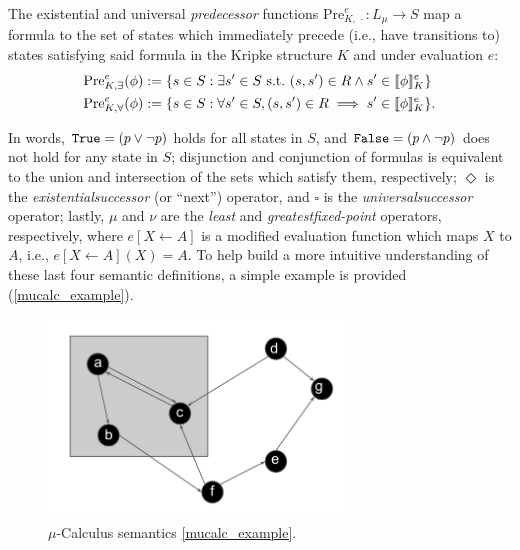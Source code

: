 \vspace*{2.2mm}
\noindent
The existential and universal {\em predecessor\/} functions $\text{Pre}_{K,\ \cdot}^e:L_\mu \to S$ map a \mucalc{} formula to the set of states which immediately precede (i.e., have transitions to) states satisfying said formula in the Kripke structure $K$ and under evaluation $e$:
\begin{align*}
    \Pree{\phi} &:= \{ s \in S : \exists s' \in S \ \text{s.t.} \ (s,s') \in R \land s' \in \brackets{\phi}_K^e\} \\
    \Prea{\phi} &:= \{ s \in S : \forall s' \in S, (s,s') \in R \implies s' \in \brackets{\phi}_K^e\}.
\end{align*}

In words, ${\texttt{True}}{} = (p \lor \lnot p)$ holds for all states in $S$, and ${\texttt{False}}{} = (p \land \lnot p)$ does not hold for any state in $S$; disjunction and conjunction of formulas is equivalent to the union and intersection of the sets which satisfy them, respectively; $\Diamond$ is the {\em existential\/successor} (or ``next'') operator, and $\square$ is the {\em universal\/successor} operator; lastly, $\mu$ and $\nu$ are the {\em least\/} and {\em greatest\/fixed-point} operators, respectively, where $e[X \leftarrow A]$ is a modified evaluation function which maps $X$ to $A$, i.e., $e[X \leftarrow A](X) = A$. To help build a more intuitive understanding of these last four semantic definitions, a simple example is provided (\autoref{mucalc_example}).

\begin{figure}
    \centering
    \includegraphics[width=0.7\textwidth]{./figures/mucalc_example}
    \caption[$\mu$-Calculus semantics example]{$\mu$-Calculus semantics \autoref{mucalc_example}.}
\label{fig:mucalc_example}
\end{figure}


